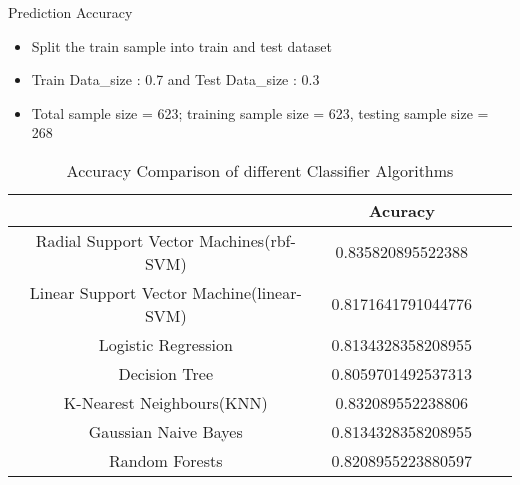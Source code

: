 \documentclass[
 size=14pt,
 paper=smartboard,  %
 mode=present, 		%
 display=slides, 	%
 style=tuliplab,  	%
 pauseslide,
 fleqn,leqno]{powerdot}
\begin{document}
\begin{slide}{Prediction Accuracy}

\begin{itemize}
\item 
   Split the train sample into train and test dataset
   \item 
   Train Data_size : 0.7 and Test Data_size : 0.3
   \item 
   Total sample size = 623; training sample size = 623, testing sample size = 268
  \end{itemize}

\begin{table}
\setlength{\abovecaptionskip}{0pt}
\setlength{\belowcaptionskip}{10pt}
\centering
\caption{Accuracy Comparison of different Classifier Algorithms}

\begin{tabular}{cccc}
  \toprule
   & Acuracy \\
\midrule
  Radial Support Vector Machines(rbf-SVM)   & 0.835820895522388 \\
  Linear Support Vector Machine(linear-SVM) & 0.8171641791044776 \\
  Logistic Regression & 0.8134328358208955 \\
  Decision Tree & 0.8059701492537313 \\
  K-Nearest Neighbours(KNN) & 0.832089552238806 \\
  Gaussian Naive Bayes & 0.8134328358208955 \\
  Random Forests & 0.8208955223880597\\
\bottomrule
\end{tabular}
\end{table}

\end{slide}





\end{document}
